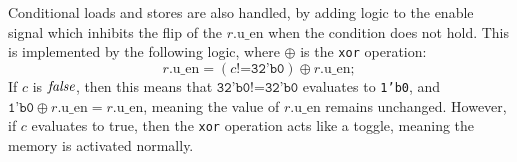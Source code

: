 \newcommand\nonblockasgn{\mathrel{\texttt{<=}}}
\newcommand\blockasgn{\mathrel{\texttt{=}}}
\newcommand\msemi{\texttt{;}\ }
\newcommand\mternary[3]{#1\mathbin{\texttt{?}}#2\mathbin{\texttt{:}}#3}
\newcommand\mxor{\oplus}
\newcommand\verilogneq{\mathbin{\texttt{!=}}}

Conditional loads and stores are also handled, by adding logic to the enable
signal which inhibits the flip of the $r.\mathrm{u\_en}$ when the condition does
not hold.  This is implemented by the following logic, where $\mxor$ is the
\texttt{xor} operation:
%
\begin{equation*}
  r.\mathrm{u\_en} \blockasgn
    (c \verilogneq \texttt{32'b0})\mxor r.\mathrm{u\_en}\msemi
\end{equation*}
%
If $c$ is $\mathit{false}$, then this means that
$\texttt{32'b0} \verilogneq \texttt{32'b0}$ evaluates to \texttt{1'b0}, and
$\texttt{1'b0} \mxor r.\mathrm{u\_en} = r.\mathrm{u\_en}$, meaning the value of
$r.\mathrm{u\_en}$ remains unchanged.  However, if $c$ evaluates to true, then
the \texttt{xor} operation acts like a toggle, meaning the memory is activated
normally.

